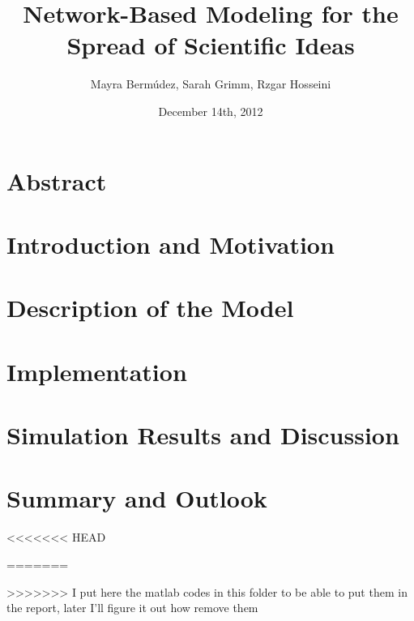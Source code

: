 \documentclass[11pt]{article}
\title{Network-Based Modeling for the Spread of Scientific Ideas}
\author{Mayra Berm\'udez, Sarah Grimm, Rzgar Hosseini}
\date{December 14th, 2012}
\begin{document}

\newpage



\newpage







\tableofcontents

\newpage




\section{Abstract}

\newpage

%
\newpage

\section{Introduction and Motivation}

\newpage

\section{Description of the Model}

\newpage

\section{Implementation}

\newpage

\section{Simulation Results and Discussion}

\newpage

\section{Summary and Outlook}

\newpage


<<<<<<< HEAD

=======
\appendix




>>>>>>> I put here the matlab codes in this folder to be able to put them in the report, later I'll figure it out how remove them

\end{document}

